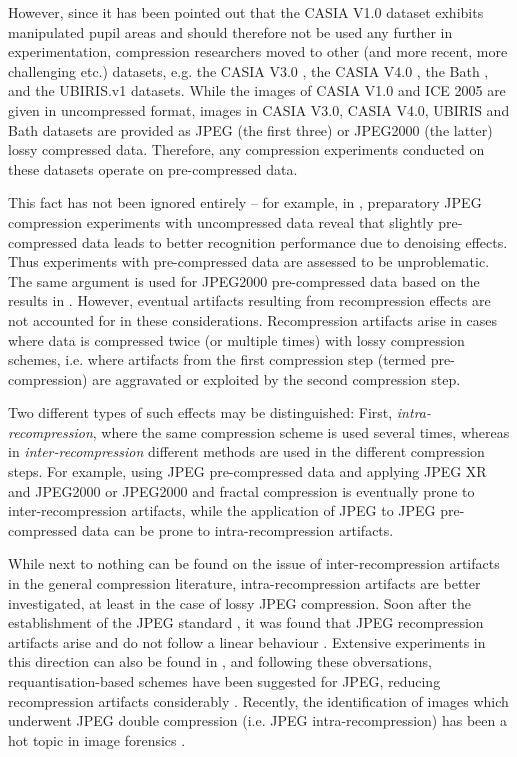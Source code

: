 \documentclass[10pt,twocolumn,letterpaper]{article}
\begin{document}
However, since it has been pointed out \cite{BPhilips07a} that the CASIA V1.0 dataset exhibits manipulated pupil areas and should therefore not be used any further in experimentation, compression researchers moved to other (and more recent, more challenging etc.) datasets, e.g. 
	the CASIA V3.0 \cite{Horvath11b,Rathgeb12e}, 
	the CASIA V4.0 \cite{BTuba12a}, the Bath \cite{BIves08a,BPardamean12a}, and the UBIRIS.v1 \cite{Haemmerle09a,BCarneiro11a} datasets.
	While the images of CASIA V1.0 and ICE 2005 are given in uncompressed format, images in CASIA V3.0, CASIA V4.0, UBIRIS and Bath datasets are provided as JPEG (the first three) or JPEG2000 (the latter) lossy compressed data. Therefore, any compression experiments conducted on these datasets operate on pre-compressed data. 
	
	This fact has not been ignored entirely -- for example, in \cite{Rathgeb12e}, preparatory JPEG compression experiments with uncompressed data reveal that 
	slightly pre-compressed data leads to better recognition performance due to denoising effects. Thus experiments with pre-compressed data are assessed to
	be unproblematic. The same argument is used for JPEG2000 pre-compressed data \cite{BPardamean12a} based on the results in \cite{BIves08a}.
	However, eventual artifacts resulting from recompression effects are not accounted for in these considerations. Recompression artifacts arise in cases where	data is compressed twice (or multiple times) with lossy compression schemes, i.e. where artifacts from the first compression step (termed pre-compression)
	are aggravated or exploited by the second compression step.
	
	Two different types of such effects may be distinguished: First, \emph{intra-recompression}, where the same compression scheme is used several times, whereas
	in \emph{inter-recompression} different methods are used in the different compression steps. For example, using JPEG pre-compressed data and applying
	JPEG XR and JPEG2000 \cite{Horvath11b} or JPEG2000 and fractal compression \cite{BCarneiro11a} is eventually prone to inter-recompression
	artifacts, while the application of JPEG to JPEG pre-compressed data \cite{BTuba12a,Rathgeb12e} can be prone to intra-recompression artifacts.
	
	While next to nothing can be found on the issue of inter-recompression artifacts in the general compression literature, 
	intra-recompression artifacts are better investigated, at least in the case of lossy JPEG compression. Soon after the establishment of
	the JPEG standard \cite{Pennebaker93a}, it was found that JPEG recompression artifacts arise and do not follow a linear behaviour \cite{Chan92a}.
	Extensive experiments in this direction can also  be found in \cite{Kumar11a}, and following these obversations, requantisation-based schemes have been
	suggested for JPEG, reducing recompression artifacts considerably \cite{Bauschke03a}. Recently, the identification of images which underwent 
	JPEG double compression (i.e. JPEG intra-recompression) has been a hot topic in image forensics \cite{Sencar12a}.
	
\end{document}
